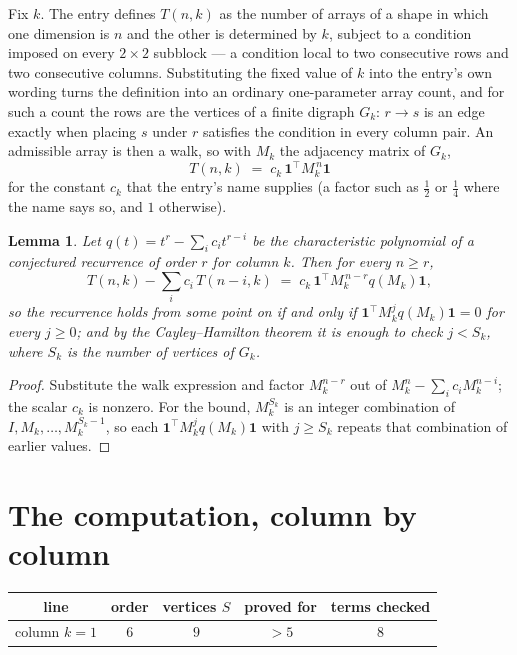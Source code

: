 \documentclass[11pt,a4paper]{article}
\theoremstyle{plain}
\newtheorem{lemma}[theorem]{Lemma}
\theoremstyle{definition}
\begin{document}
Fix $k$. The entry defines $T(n,k)$ as the number of arrays of a shape in which one dimension
is $n$ and the other is determined by $k$, subject to a condition imposed on every
$2\times2$ subblock --- a condition local to two consecutive rows and two consecutive columns.
Substituting the fixed value of $k$ into the entry's own wording turns the definition into an
ordinary one-parameter array count, and for such a count the rows are the vertices of a finite
digraph $G_k$: $r\to s$ is an edge exactly when placing $s$ under $r$ satisfies the condition
in every column pair. An admissible array is then a walk, so with $M_k$ the adjacency matrix
of $G_k$,
\[
T(n,k)\;=\;c_k\,\mathbf{1}^{\!\top}M_k^{\,n}\mathbf{1}
\]
for the constant $c_k$ that the entry's name supplies (a factor such as $\tfrac12$ or
$\tfrac14$ where the name says so, and $1$ otherwise).

\begin{lemma}\label{lem:crit}
Let $q(t)=t^{r}-\sum_i c_it^{r-i}$ be the characteristic polynomial of a conjectured
recurrence of order $r$ for column $k$. Then for every $n\ge r$,
\[
T(n,k)-\sum_i c_i\,T(n-i,k)\;=\;c_k\,\mathbf{1}^{\!\top}M_k^{\,n-r}q(M_k)\mathbf{1},
\]
so the recurrence holds from some point on if and only if
$\mathbf{1}^{\!\top}M_k^{j}q(M_k)\mathbf{1}=0$ for every $j\ge0$; and by the
Cayley--Hamilton theorem it is enough to check $j<S_k$, where $S_k$ is the number of vertices
of $G_k$.
\end{lemma}

\begin{proof}
Substitute the walk expression and factor $M_k^{n-r}$ out of $M_k^{n}-\sum_ic_iM_k^{n-i}$;
the scalar $c_k$ is nonzero. For the bound, $M_k^{S_k}$ is an integer combination of
$I,M_k,\dots,M_k^{S_k-1}$, so each $\mathbf{1}^{\!\top}M_k^{j}q(M_k)\mathbf{1}$ with
$j\ge S_k$ repeats that combination of earlier values.
\end{proof}

\section{The computation, column by column}

\begin{center}
\begin{tabular}{ccccc}
line & order & vertices $S$ & proved for & terms checked \\ \hline
column $k$$=1$ & $6$ & $9$ & $>5$ & $8$ \\
\end{tabular}
\end{center}
\end{document}
